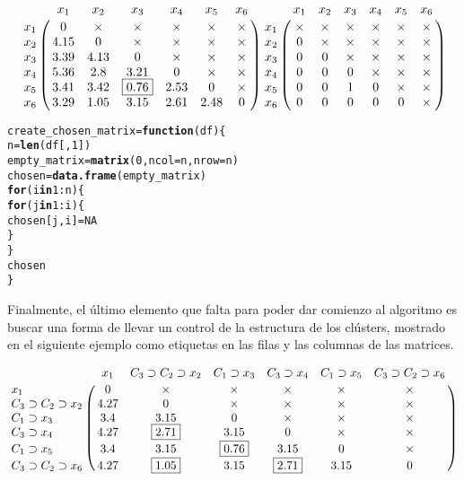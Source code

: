 \documentclass[12pt]{report}\usepackage[]{graphicx}\usepackage[dvipsnames]{xcolor}
\makeatletter
\newcommand{\hlnum}[1]{\textcolor[rgb]{0.686,0.059,0.569}{#1}}%
\newcommand{\hlopt}[1]{\textcolor[rgb]{0,0,0}{#1}}%
\newcommand{\hlstd}[1]{\textcolor[rgb]{0.345,0.345,0.345}{#1}}%
\newcommand{\hlkwa}[1]{\textcolor[rgb]{0.161,0.373,0.58}{\textbf{#1}}}%
\newcommand{\hlkwb}[1]{\textcolor[rgb]{0.69,0.353,0.396}{#1}}%
\newcommand{\hlkwc}[1]{\textcolor[rgb]{0.333,0.667,0.333}{#1}}%
\newcommand{\hlkwd}[1]{\textcolor[rgb]{0.737,0.353,0.396}{\textbf{#1}}}%
\newenvironment{kframe}{%
 \def\at@end@of@kframe{}%
 \ifinner\ifhmode%
  \def\at@end@of@kframe{\end{minipage}}%
  \begin{minipage}{\columnwidth}%
 \fi\fi%
 \def\FrameCommand##1{\hskip\@totalleftmargin \hskip-\fboxsep
 \colorbox{shadecolor}{##1}\hskip-\fboxsep
     \hskip-\linewidth \hskip-\@totalleftmargin \hskip\columnwidth}%
 \MakeFramed {\advance\hsize-\width
   \@totalleftmargin\z@ \linewidth\hsize
   \@setminipage}}%
 {\par\unskip\endMakeFramed%
 \at@end@of@kframe}
\newenvironment{knitrout}{}{} %
\makeatother
\begin{document}
		 		$$
		 		\bordermatrix{
		 			& x_1 & x_2 & x_3 & x_4 & x_5 & x_6 \cr
		 			x_1 & 0 & \times & \times & \times & \times & \times\cr
		 			x_2 & 4.15 & 0 & \times & \times & \times & \times\cr
		 			x_3 & 3.39 & 4.13 & 0 & \times & \times & \times\cr
		 			x_4 & 5.36 & 2.8 & 3.21 & 0 & \times & \times\cr
		 			x_5 & 3.41 & 3.42 & \boxed{0.76} & 2.53 & 0 & \times\cr
		 			x_6 & 3.29 & 1.05 & 3.15 & 2.61 & 2.48 & 0
		 		}
		 		\bordermatrix{
		 			& x_1 & x_2 & x_3 & x_4 & x_5 & x_6 \cr
		 			x_1 & \times & \times & \times & \times & \times & \times\cr
		 			x_2 & 0 & \times & \times & \times & \times & \times\cr
		 			x_3 & 0 & 0 & \times & \times & \times & \times\cr
		 			x_4 & 0 & 0 & 0 & \times & \times & \times\cr
		 			x_5 & 0 & 0 & 1 & 0 & \times & \times\cr
		 			x_6 & 0 & 0 & 0 & 0 & 0 & \times
		 		}
		 		$$
		 		
\begin{knitrout}
\color{fgcolor}\begin{kframe}
\begin{alltt}
\hlstd{create_chosen_matrix} \hlkwb{=} \hlkwa{function}\hlstd{(}\hlkwc{df}\hlstd{) \{}
        \hlstd{n} \hlkwb{=} \hlkwd{len}\hlstd{(df[,} \hlnum{1}\hlstd{])}
        \hlstd{empty_matrix} \hlkwb{=} \hlkwd{matrix}\hlstd{(}\hlnum{0}\hlstd{,} \hlkwc{ncol} \hlstd{= n,} \hlkwc{nrow} \hlstd{= n)}
        \hlstd{chosen} \hlkwb{=} \hlkwd{data.frame}\hlstd{(empty_matrix)}
        \hlkwa{for} \hlstd{(i} \hlkwa{in} \hlnum{1}\hlopt{:}\hlstd{n) \{}
                \hlkwa{for} \hlstd{(j} \hlkwa{in} \hlnum{1}\hlopt{:}\hlstd{i) \{}
                        \hlstd{chosen[j, i]} \hlkwb{=} \hlnum{NA}
                \hlstd{\}}
        \hlstd{\}}
        \hlstd{chosen}
\hlstd{\}}
\end{alltt}
\end{kframe}
\end{knitrout}
		 		
		 		Finalmente, el último elemento que falta para poder dar comienzo al algoritmo es buscar una forma de llevar un control de la estructura de los clústers, mostrado en el siguiente ejemplo como etiquetas en las filas y las columnas de las matrices. 
		 		
		 		\begin{equation}\label{eq:dist_matrix}
		 		\bordermatrix{
		 			& x_1 & C_3 \supset C_2 \supset x_2 & C_1 \supset x_3 & C_3 \supset x_4 & C_1 \supset x_5 & C_3 \supset C_2 \supset x_6 \cr
		 			x_1 & 0 & \times & \times & \times & \times & \times\cr
		 			C_3 \supset C_2 \supset x_2 & 4.27 & 0 & \times & \times & \times & \times\cr
		 			C_1 \supset x_3 & 3.4 & 3.15 & 0 & \times & \times & \times\cr
		 			C_3 \supset x_4 & 4.27 & \boxed{2.71} & 3.15 & 0 & \times & \times\cr
		 			C_1 \supset x_5 & 3.4 & 3.15 & \boxed{0.76} & 3.15 & 0 & \times\cr
		 			C_3 \supset C_2 \supset x_6 & 4.27 & \boxed{1.05} & 3.15 & \boxed{2.71} & 3.15 & 0
		 		}
		 		\end{equation}
		 		
\end{document}

